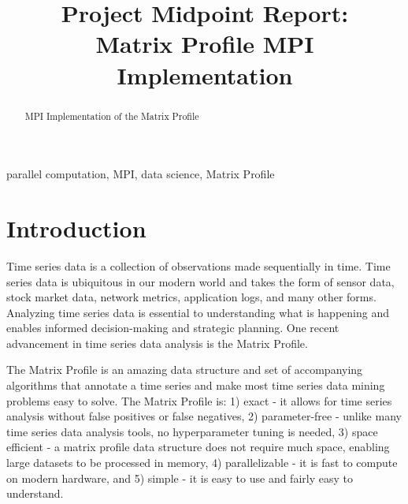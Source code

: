 \documentclass[conference]{IEEEtran}
\begin{document}
\title{Project Midpoint Report:\\Matrix Profile MPI Implementation}

\author{
}


\maketitle
\begin{abstract}
MPI Implementation of the Matrix Profile
\end{abstract}

\begin{IEEEkeywords}
parallel computation, MPI, data science, Matrix Profile
\end{IEEEkeywords}




\section{Introduction}
Time series data is a collection of observations made sequentially in time.  Time series data is ubiquitous in our modern world and takes the form of sensor data, stock market data, network metrics, application logs, and many other forms.  Analyzing time series data is essential to understanding what is happening and enables informed decision-making and strategic planning.  One recent advancement in time series data analysis is the Matrix Profile\cite{MatrixProfile1}. 

The Matrix Profile is an amazing data structure and set of accompanying algorithms that annotate a time series and make most time series data mining problems easy to solve\cite{MatrixProfile2}. The Matrix Profile is:  1) exact - it allows for time series analysis without false positives or false negatives, 2) parameter-free - unlike many time series data analysis tools, no hyperparameter tuning is needed, 3) space efficient - a matrix profile data structure does not require much space, enabling large datasets to be processed in memory, 4) parallelizable - it is fast to compute on modern hardware, and 5) simple - it is easy to use and fairly easy to understand\cite{Keogh}.   
\end{document}
